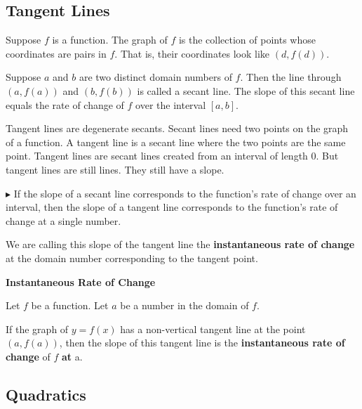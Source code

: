 \documentclass{ximera}
\begin{document}
\subsection*{Tangent Lines}

Suppose $f$ is a function.  The graph of $f$ is the collection of points whose coordinates are pairs in $f$.  That is, their coordinates look like $(d, f(d))$.

Suppose $a$ and $b$ are two distinct domain numbers of $f$.  Then the line through $(a, f(a))$ and $(b, f(b))$ is called a secant line.  The slope of this secant line equals the rate of change of $f$ over the interval $[a, b]$.

Tangent lines are degenerate secants. Secant lines need two points on the graph of a function.  A tangent line is a secant line where the two points are the same point. Tangent lines are secant lines created from an interval of length $0$.  But tangent lines are still lines.  They still have a slope.


\textbf{\textcolor{red!90!darkgray}{$\blacktriangleright$}} If the slope of a secant line corresponds to the function's rate of change over an interval, then the slope of a tangent line corresponds to the function's rate of change at a single number.


We are calling this slope of the tangent line the \textbf{\textcolor{purple!85!blue}{instantaneous rate of change}} at the domain number corresponding to the tangent point.




\begin{definition} \textbf{\textcolor{green!50!black}{Instantaneous Rate of Change}}  


Let $f$ be a function. Let $a$ be a number in the domain of $f$.

If the graph of $y = f(x)$ has a non-vertical tangent line at the point $(a, f(a))$, then the slope of this tangent line is the \textbf{instantaneous rate of change} of $f$ \textbf{at} a.


\end{definition}














\subsection*{Quadratics}
\end{document}
